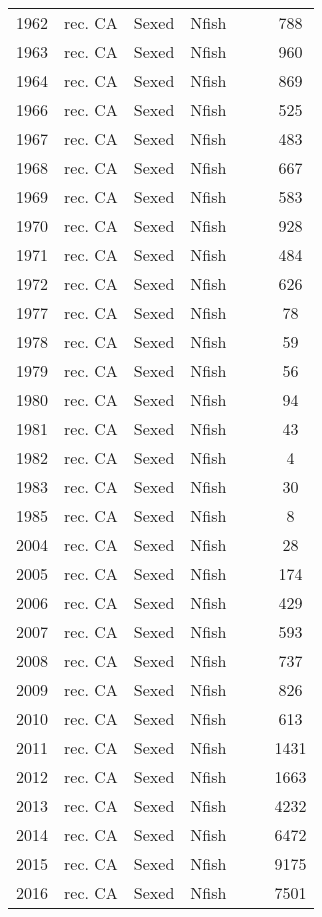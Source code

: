 \begin{longtable}[t]{c>{\centering\arraybackslash}p{3cm}ccccc}
1962 & rec. CA & Sexed & Nfish &  &  & 788\\
1963 & rec. CA & Sexed & Nfish &  &  & 960\\
1964 & rec. CA & Sexed & Nfish &  &  & 869\\
1966 & rec. CA & Sexed & Nfish &  &  & 525\\
1967 & rec. CA & Sexed & Nfish &  &  & 483\\
1968 & rec. CA & Sexed & Nfish &  &  & 667\\
1969 & rec. CA & Sexed & Nfish &  &  & 583\\
1970 & rec. CA & Sexed & Nfish &  &  & 928\\
1971 & rec. CA & Sexed & Nfish &  &  & 484\\
1972 & rec. CA & Sexed & Nfish &  &  & 626\\
1977 & rec. CA & Sexed & Nfish &  &  & 78\\
1978 & rec. CA & Sexed & Nfish &  &  & 59\\
1979 & rec. CA & Sexed & Nfish &  &  & 56\\
1980 & rec. CA & Sexed & Nfish &  &  & 94\\
1981 & rec. CA & Sexed & Nfish &  &  & 43\\
1982 & rec. CA & Sexed & Nfish &  &  & 4\\
1983 & rec. CA & Sexed & Nfish &  &  & 30\\
1985 & rec. CA & Sexed & Nfish &  &  & 8\\
2004 & rec. CA & Sexed & Nfish &  &  & 28\\
2005 & rec. CA & Sexed & Nfish &  &  & 174\\
2006 & rec. CA & Sexed & Nfish &  &  & 429\\
2007 & rec. CA & Sexed & Nfish &  &  & 593\\
2008 & rec. CA & Sexed & Nfish &  &  & 737\\
2009 & rec. CA & Sexed & Nfish &  &  & 826\\
2010 & rec. CA & Sexed & Nfish &  &  & 613\\
2011 & rec. CA & Sexed & Nfish &  &  & 1431\\
2012 & rec. CA & Sexed & Nfish &  &  & 1663\\
2013 & rec. CA & Sexed & Nfish &  &  & 4232\\
2014 & rec. CA & Sexed & Nfish &  &  & 6472\\
2015 & rec. CA & Sexed & Nfish &  &  & 9175\\
2016 & rec. CA & Sexed & Nfish &  &  & 7501\\

\end{longtable}
